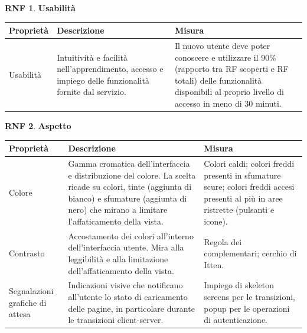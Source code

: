 \documentclass[11pt, a4paper]{article}
\theoremstyle{definition} %
\newtheorem{nonfuncreq}{RNF} %
\begin{document}
\begin{nonfuncreq}
    \textbf{Usabilità }
    \begin{center}
        \footnotesize
        \begin{tabularx}{\textwidth}{|X||X||X|}
            \hline
            \cellcolor{red!70}Proprietà & \cellcolor{red!70}Descrizione & \cellcolor{red!70}Misura\\
            \hline
            Usabilità & Intuitività e facilità nell'apprendimento, accesso e impiego delle funzionalità fornite dal servizio. & Il nuovo utente deve poter conoscere e utilizzare il 90\% (rapporto tra RF scoperti e RF totali) delle funzionalità disponibili al proprio livello di accesso in meno di 30 minuti.\\
            \hline
        \end{tabularx}
    \end{center}
\end{nonfuncreq}

\begin{nonfuncreq}
    \textbf{Aspetto }
    \begin{center}
        \footnotesize
        \begin{tabularx}{\textwidth}{|X||X||X|}
            \hline
            \cellcolor{red!70}Proprietà & \cellcolor{red!70}Descrizione & \cellcolor{red!70}Misura\\
            \hline
            Colore & Gamma cromatica dell'interfaccia e distribuzione del colore. La scelta ricade su colori, tinte (aggiunta di bianco) e sfumature (aggiunta di nero) che mirano a limitare l'affaticamento della vista. & Colori caldi; colori freddi presenti in sfumature scure; colori freddi accesi presenti al più in aree ristrette (pulsanti e icone).\\
            \hline
            Contrasto & Accostamento dei colori all'interno dell'interfaccia utente. Mira alla leggibilità e alla limitazione dell'affaticamento della vista. & Regola dei complementari; cerchio di Itten.\\
            \hline
            Segnalazioni grafiche di attesa & Indicazioni visive che notificano all'utente lo stato di caricamento delle pagine, in particolare durante le transizioni client-server. & Impiego di skeleton screens per le transizioni, popup per le operazioni di autenticazione.\\
            \hline
        \end{tabularx}
    \end{center}
\end{nonfuncreq}
\end{document}
